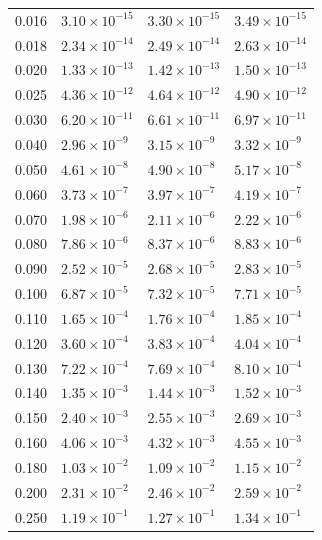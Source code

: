 \documentclass[onecolumn,notitlepage]{revtex4-1}
\begin{document}
\begin{table}[ht]
\begin{minipage}{0.45\linewidth}
\begin{tabular}{| c | l | l | l |}
0.016 & $3.10 \times 10^{-15}$ & $3.30 \times 10^{-15}$ & $3.49 \times 10^{-15}$ \\
0.018 & $2.34 \times 10^{-14}$ & $2.49 \times 10^{-14}$ & $2.63 \times 10^{-14}$ \\
0.020  & $1.33 \times 10^{-13}$ & $1.42 \times 10^{-13}$ & $1.50 \times 10^{-13}$ \\
0.025 & $4.36 \times 10^{-12}$ & $4.64 \times 10^{-12}$ & $4.90 \times 10^{-12}$ \\
0.030  & $6.20 \times 10^{-11}$ & $6.61 \times 10^{-11}$ & $6.97 \times 10^{-11}$ \\
0.040  & $2.96 \times 10^{-9}$  & $3.15 \times 10^{-9}$  & $3.32 \times 10^{-9}$ \\
0.050  & $4.61 \times 10^{-8}$  & $4.90 \times 10^{-8}$  & $5.17 \times 10^{-8}$ \\
0.060  & $3.73 \times 10^{-7}$  & $3.97 \times 10^{-7}$  & $4.19 \times 10^{-7}$  \\
0.070  & $1.98 \times 10^{-6}$  & $2.11 \times 10^{-6}$  & $2.22 \times 10^{-6}$  \\
0.080  & $7.86 \times 10^{-6}$  & $8.37 \times 10^{-6}$  & $8.83 \times 10^{-6}$  \\
0.090  & $2.52 \times 10^{-5}$  & $2.68 \times 10^{-5}$  & $2.83 \times 10^{-5}$  \\
0.100   & $6.87 \times 10^{-5}$  & $7.32 \times 10^{-5}$  & $7.71 \times 10^{-5}$  \\
0.110  & $1.65 \times 10^{-4}$  & $1.76 \times 10^{-4}$  & $1.85 \times 10^{-4}$  \\
0.120  & $3.60 \times 10^{-4}$  & $3.83 \times 10^{-4}$  & $4.04 \times 10^{-4}$  \\
0.130  & $7.22 \times 10^{-4}$  & $7.69 \times 10^{-4}$  & $8.10 \times 10^{-4}$  \\
0.140  & $1.35 \times 10^{-3}$  & $1.44 \times 10^{-3}$  & $1.52 \times 10^{-3}$  \\
0.150  & $2.40 \times 10^{-3}$  & $2.55 \times 10^{-3}$  & $2.69 \times 10^{-3}$  \\
0.160  & $4.06 \times 10^{-3}$  & $4.32 \times 10^{-3}$  & $4.55 \times 10^{-3}$  \\
0.180  & $1.03 \times 10^{-2}$  & $1.09 \times 10^{-2}$  & $1.15 \times 10^{-2}$  \\
0.200   & $2.31 \times 10^{-2}$  & $2.46 \times 10^{-2}$  & $2.59 \times 10^{-2}$  \\
0.250  & $1.19 \times 10^{-1}$  & $1.27 \times 10^{-1}$  & $1.34 \times 10^{-1}$  \\

\end{tabular}
\end{minipage}
\end{table}
\end{document}
